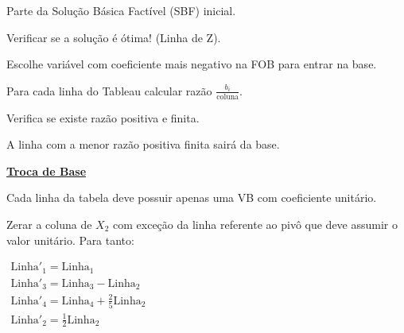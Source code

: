 \begin{frame}
	
	\begin{columns}
		\begin{column}{0.5\textwidth}
		\only<1>
		{
			\begin{mdframed}[backgroundcolor=orange!80]
				Parte da Solução Básica Factível (SBF)	inicial.
			\end{mdframed}
		}
		{
			\begin{mdframed}[backgroundcolor=olive!80]
				Verificar se a solução é ótima! (Linha de Z).
			\end{mdframed}
		}
		{
			\begin{mdframed}[backgroundcolor=orange!80]
				Escolhe variável com coeficiente mais negativo na FOB para entrar na base.
			\end{mdframed}
		}
		{
			\begin{mdframed}[backgroundcolor=olive!80]
				Para cada linha do Tableau calcular razão $\frac{b_i}{\text{coluna}}$.
			\end{mdframed}
		}
		{
			\begin{mdframed}[backgroundcolor=orange!80]
				Verifica se existe razão positiva e finita.
			\end{mdframed}
		}
		{
			\begin{mdframed}[backgroundcolor=olive!80]
				A linha com a menor razão positiva finita sairá da base.
			\end{mdframed}
		}
		{
			\underline{\textbf{Troca de Base}}
			\begin{mdframed}[backgroundcolor=orange!80]
				Cada linha da tabela deve possuir apenas uma VB com coeficiente unitário.
			\end{mdframed}
		}
		{
			\scriptsize Zerar a coluna de $X_2$ com exceção da linha referente ao pivô que deve assumir o valor unitário. Para tanto: 
			\begin{mdframed}[backgroundcolor=olive!80]
					\centering
					$
						\begin{matrix}
							\text{Linha}'_1 = \text{Linha}_1 \\ 
							\text{Linha}'_3 = \text{Linha}_3 - \text{Linha}_2\\ 
							\text{Linha}'_4 = \text{Linha}_4 + \frac{2}{5}\text{Linha}_2 \\ 
							\text{Linha}'_2 = \frac{1}{2}\text{Linha}_2 \\						 
						\end{matrix}
					$
			\end{mdframed}
		}

\end{column}
\end{columns}
\end{frame}
